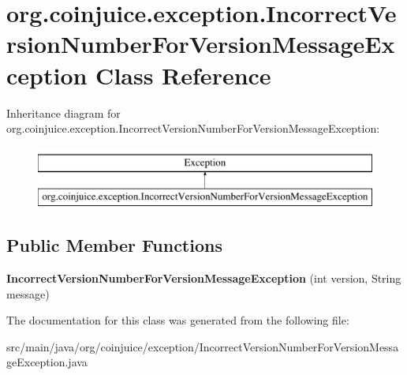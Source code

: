 \hypertarget{classorg_1_1coinjuice_1_1exception_1_1_incorrect_version_number_for_version_message_exception}{\section{org.\-coinjuice.\-exception.\-Incorrect\-Version\-Number\-For\-Version\-Message\-Exception Class Reference}
\label{classorg_1_1coinjuice_1_1exception_1_1_incorrect_version_number_for_version_message_exception}
}
Inheritance diagram for org.\-coinjuice.\-exception.\-Incorrect\-Version\-Number\-For\-Version\-Message\-Exception\-:\begin{figure}[H]
\begin{center}
\leavevmode
\includegraphics[height=2.000000cm]{classorg_1_1coinjuice_1_1exception_1_1_incorrect_version_number_for_version_message_exception}
\end{center}
\end{figure}
\subsection*{Public Member Functions}
\begin{DoxyCompactItemize}
\item 
\hypertarget{classorg_1_1coinjuice_1_1exception_1_1_incorrect_version_number_for_version_message_exception_a7231c398008ac4156452112d9ee8c08a}{{\bfseries Incorrect\-Version\-Number\-For\-Version\-Message\-Exception} (int version, String message)}\label{classorg_1_1coinjuice_1_1exception_1_1_incorrect_version_number_for_version_message_exception_a7231c398008ac4156452112d9ee8c08a}

\end{DoxyCompactItemize}


The documentation for this class was generated from the following file\-:\begin{DoxyCompactItemize}
\item 
src/main/java/org/coinjuice/exception/Incorrect\-Version\-Number\-For\-Version\-Message\-Exception.\-java\end{DoxyCompactItemize}

